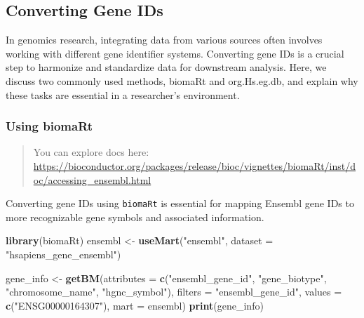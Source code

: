 \documentclass[
]{book}
\newenvironment{Shaded}{\begin{snugshade}}{\end{snugshade}}
\newcommand{\AttributeTok}[1]{\textcolor[rgb]{0.13,0.29,0.53}{#1}}
\newcommand{\FunctionTok}[1]{\textcolor[rgb]{0.13,0.29,0.53}{\textbf{#1}}}
\newcommand{\NormalTok}[1]{#1}
\newcommand{\OtherTok}[1]{\textcolor[rgb]{0.56,0.35,0.01}{#1}}
\newcommand{\StringTok}[1]{\textcolor[rgb]{0.31,0.60,0.02}{#1}}
\begin{document}
\hypertarget{converting-gene-ids}{%
\subsection{Converting Gene IDs}\label{converting-gene-ids}}

In genomics research, integrating data from various sources often involves working with different gene identifier systems. Converting gene IDs is a crucial step to harmonize and standardize data for downstream analysis. Here, we discuss two commonly used methods, biomaRt and org.Hs.eg.db, and explain why these tasks are essential in a researcher's environment.

\hypertarget{using-biomart}{%
\subsubsection{Using biomaRt}\label{using-biomart}}

\begin{quote}
You can explore docs here: \url{https://bioconductor.org/packages/release/bioc/vignettes/biomaRt/inst/doc/accessing_ensembl.html}
\end{quote}

Converting gene IDs using \texttt{biomaRt} is essential for mapping Ensembl gene IDs to more recognizable gene symbols and associated information.

\begin{Shaded}
\begin{Highlighting}[]
\FunctionTok{library}\NormalTok{(biomaRt)}
\NormalTok{ensembl }\OtherTok{\textless{}{-}} \FunctionTok{useMart}\NormalTok{(}\StringTok{"ensembl"}\NormalTok{, }\AttributeTok{dataset =} \StringTok{"hsapiens\_gene\_ensembl"}\NormalTok{)}

\NormalTok{gene\_info }\OtherTok{\textless{}{-}} \FunctionTok{getBM}\NormalTok{(}\AttributeTok{attributes =} \FunctionTok{c}\NormalTok{(}\StringTok{"ensembl\_gene\_id"}\NormalTok{, }\StringTok{"gene\_biotype"}\NormalTok{,}
                                  \StringTok{"chromosome\_name"}\NormalTok{, }\StringTok{"hgnc\_symbol"}\NormalTok{),}
                   \AttributeTok{filters =} \StringTok{"ensembl\_gene\_id"}\NormalTok{, }
                   \AttributeTok{values =} \FunctionTok{c}\NormalTok{(}\StringTok{"ENSG00000164307"}\NormalTok{), }
                   \AttributeTok{mart =}\NormalTok{ ensembl)}
\FunctionTok{print}\NormalTok{(gene\_info)}
\end{Highlighting}
\end{Shaded}
\end{document}
